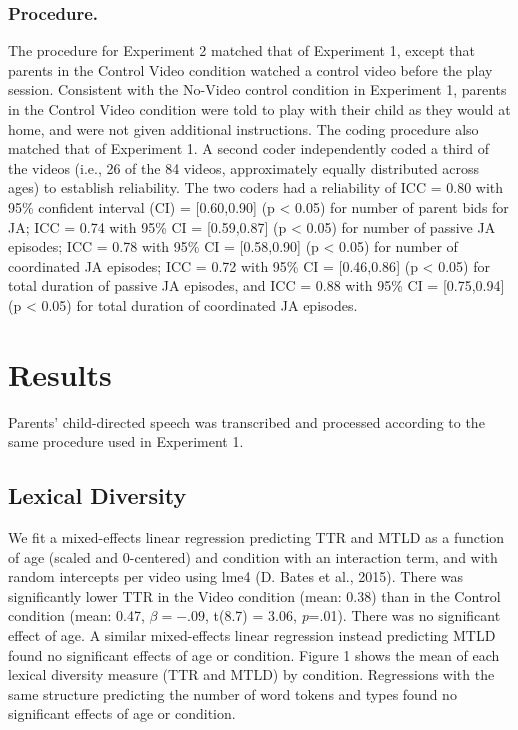 \documentclass[10pt, letterpaper]{article}
\begin{document}
\subsubsection{Procedure.}\label{procedure.-1}

The procedure for Experiment 2 matched that of Experiment 1, except that
parents in the Control Video condition watched a control video before
the play session. Consistent with the No-Video control condition in
Experiment 1, parents in the Control Video condition were told to play
with their child as they would at home, and were not given additional
instructions. The coding procedure also matched that of Experiment 1. A
second coder independently coded a third of the videos (i.e., 26 of the
84 videos, approximately equally distributed across ages) to establish
reliability. The two coders had a reliability of ICC = 0.80 with 95\%
confident interval (CI) = {[}0.60,0.90{]} (p \textless{} 0.05) for
number of parent bids for JA; ICC = 0.74 with 95\% CI = {[}0.59,0.87{]}
(p \textless{} 0.05) for number of passive JA episodes; ICC = 0.78 with
95\% CI = {[}0.58,0.90{]} (p \textless{} 0.05) for number of coordinated
JA episodes; ICC = 0.72 with 95\% CI = {[}0.46,0.86{]} (p \textless{}
0.05) for total duration of passive JA episodes, and ICC = 0.88 with
95\% CI = {[}0.75,0.94{]} (p \textless{} 0.05) for total duration of
coordinated JA episodes.

\section{Results}\label{results-1}

Parents' child-directed speech was transcribed and processed according
to the same procedure used in Experiment 1.

\subsection{Lexical Diversity}\label{lexical-diversity-1}

We fit a mixed-effects linear regression predicting TTR and MTLD as a
function of age (scaled and 0-centered) and condition with an
interaction term, and with random intercepts per video using lme4 (D.
Bates et al., 2015). There was significantly lower TTR in the Video
condition (mean: 0.38) than in the Control condition (mean: 0.47,
\(\beta=-.09\), t(8.7) = 3.06, \emph{p}=.01). There was no significant
effect of age. A similar mixed-effects linear regression instead
predicting MTLD found no significant effects of age or condition. Figure
1 shows the mean of each lexical diversity measure (TTR and MTLD) by
condition. Regressions with the same structure predicting the number of
word tokens and types found no significant effects of age or condition.
\end{document}
